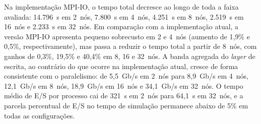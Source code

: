 Na implementação MPI-IO, o tempo total decresce ao longo de toda a
faixa avaliada: 14.796~s em 2~nós, 7.800~s em 4~nós, 4.251~s em
8~nós, 2.519~s em 16~nós e 2.233~s em 32~nós. Em comparação com a
implementação atual, a versão MPI-IO apresenta pequeno sobrecusto em
2 e 4~nós (aumento de 1{,}9\% e 0{,}5\%, respectivamente), mas passa
a reduzir o tempo total a partir de 8~nós, com ganhos de 0{,}3\%,
19{,}5\% e 40{,}4\% em 8, 16 e 32~nós. A banda agregada do
\textit{layer} de escrita, ao contrário do que ocorre na implementação
atual, cresce de forma consistente com o paralelismo: de 5{,}5~Gb/s
em 2~nós para 8{,}9~Gb/s em 4~nós, 12{,}1~Gb/s em 8~nós,
18{,}9~Gb/s em 16~nós e 34{,}1~Gb/s em 32~nós. O tempo médio de E/S
por processo cai de 321~s em 2~nós para 64{,}1~s em 32~nós, e a
parcela percentual de E/S no tempo de simulação permanece abaixo de
5\% em todas as configurações.

\begin{table}[H]
\centering
\caption{Desempenho do Experimento SDumont com a implementação MPI-IO. O
tempo total corresponde ao tempo de execução medido, que inclui computação,
E/S, comunicação e \texttt{MPI\_File\_open}/\texttt{MPI\_File\_close}. Este trabalho calcula a eficiência em relação
à base de 2~nós.}
\label{tab:mpiio_sdumont}
\small
\setlength{\tabcolsep}{4pt}
\renewcommand{\arraystretch}{1.25}
\end{table}

